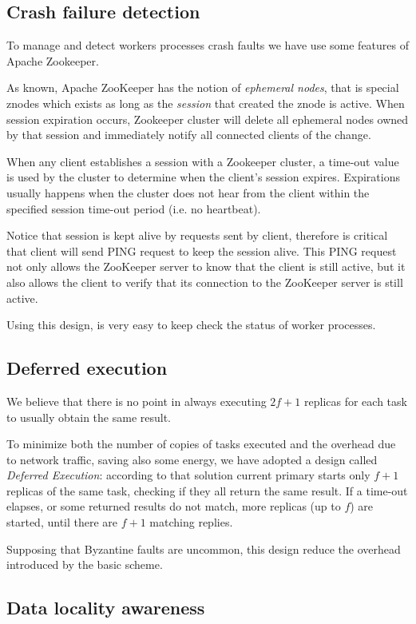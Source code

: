 \documentclass[sigchi]{acmart}
\begin{document}
\subsection{Crash failure detection} To manage and detect workers processes crash faults we have use some features of Apache Zookeeper. 

As known, Apache ZooKeeper has the notion of \textit{ephemeral nodes}, that is special znodes which exists as long as the \textit{session} that created the znode is active. When session expiration occurs, Zookeeper cluster will delete all ephemeral nodes owned by that session and immediately notify all connected clients of the change.

When any client establishes a session with a Zookeeper cluster, a time-out value is used by the cluster to determine when the client's session expires. Expirations usually happens when the cluster does not hear from the client within the specified session time-out period (i.e. no heartbeat).

Notice that session is kept alive by requests sent by client, therefore is critical that client will send PING request to keep the session alive. This PING request not only allows the ZooKeeper server to know that the client is still active, but it also allows the client to verify that its connection to the ZooKeeper server is still active.

Using this design, is very easy to keep check the status of worker processes.

\subsection{Deferred execution} We believe that there is no point in always executing $2f + 1$ replicas for each task to usually obtain the same result. 

To minimize both the number of copies of tasks executed and the overhead due to network traffic, saving also some energy, we have adopted a design called \textit{Deferred Execution}: according to that solution current primary starts only $f + 1$ replicas of the same task, checking if they all return the same result. If a time-out elapses, or some returned results do not match, more replicas (up to $f$) are started, until there are $f + 1$ matching replies. 

Supposing that Byzantine faults are uncommon, this design reduce the overhead introduced by the basic scheme.

\subsection{Data locality awareness}
\end{document}
